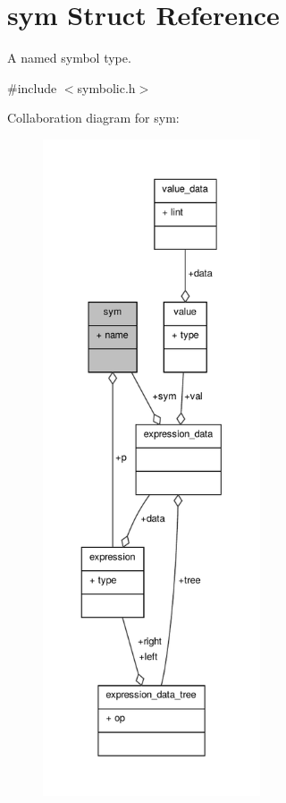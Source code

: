 \hypertarget{structsym}{\section{sym Struct Reference}
\label{structsym}
}


A named symbol type.  




{\ttfamily \#include $<$symbolic.\+h$>$}



Collaboration diagram for sym\+:\nopagebreak
\begin{figure}[H]
\begin{center}
\leavevmode
\includegraphics[height=550pt]{structsym__coll__graph}
\end{center}
\end{figure}
